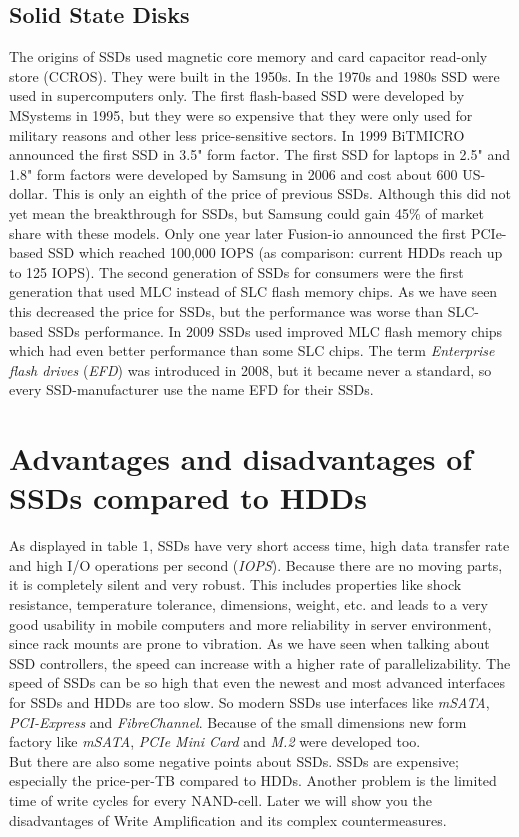 \documentclass{acm_proc_article-sp}
\begin{document}
\subsection{Solid State Disks}
The origins of SSDs used magnetic core memory and card capacitor read-only store (CCROS). They were built in the 1950s. In the 1970s and 1980s SSD were used in supercomputers only. The first flash-based SSD were developed by MSystems in 1995, but they were so expensive that they were only used for military reasons and other less price-sensitive sectors. In 1999 BiTMICRO announced the first SSD in 3.5" form factor. The first SSD for laptops in 2.5" and 1.8" form factors were developed by Samsung in 2006 and cost about 600 US-dollar. This is only an eighth of the price of previous SSDs. Although this did not yet mean the breakthrough for SSDs, but Samsung could gain 45\% of market share with these models. Only one year later Fusion-io announced the first PCIe-based SSD which reached 100,000 IOPS (as comparison: current HDDs reach up to 125 IOPS). The second generation of SSDs for consumers were the first generation that used MLC instead of SLC flash memory chips. As we have seen this decreased the price for SSDs, but the performance was worse than SLC-based SSDs performance. In 2009 SSDs used improved MLC flash memory chips which had even better performance than some SLC chips. The term \emph{Enterprise flash drives} (\emph{EFD}) was introduced in 2008, but it became never a standard, so every SSD-manufacturer use the name EFD for their SSDs.

\section{Advantages and disadvantages of SSDs compared to HDDs}

As displayed in table 1, SSDs have very short access time, high data transfer rate and high I/O operations per second (\emph{IOPS}). Because there are no moving parts, it is completely silent and very robust. This includes properties like shock resistance, temperature tolerance, dimensions, weight, etc. and leads to a very good usability in mobile computers and more reliability in server environment, since rack mounts are prone to vibration. As we have seen when talking about SSD controllers, the speed can increase with a higher rate of parallelizability. The speed of SSDs can be so high that even the newest and most advanced interfaces for SSDs and HDDs are too slow. So modern SSDs use interfaces like \emph{mSATA}, \emph{PCI-Express} and \emph{FibreChannel}. Because of the small dimensions new form factory like \emph{mSATA}, \emph{PCIe Mini Card} and \emph{M.2} were developed too.
\\
But there are also some negative points about SSDs. SSDs are expensive; especially the price-per-TB compared to HDDs. Another problem is the limited time of write cycles for every NAND-cell. Later we will show you the disadvantages of Write Amplification and its complex countermeasures.
\end{document}
